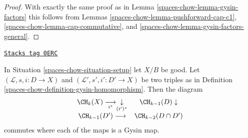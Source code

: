 \begin{proof}
With exactly the same proof as in Lemma \ref{spaces-chow-lemma-gysin-factors}
this follows from Lemmas
\ref{spaces-chow-lemma-pushforward-cap-c1},
\ref{spaces-chow-lemma-cap-commutative}, and
\ref{spaces-chow-lemma-gysin-factors-general}.
\end{proof}

\begin{lemma}
\label{spaces-chow-lemma-gysin-commutes-gysin}
\href{https://stacks.math.columbia.edu/tag/0ERC}{\texttt{Stacks tag 0ERC}}

In Situation \ref{spaces-chow-situation-setup} let $X/B$ be good.
Let $(\mathcal{L}, s, i : D \to X)$ and
$(\mathcal{L}', s', i' : D' \to X)$ be two triples as in
Definition \ref{spaces-chow-definition-gysin-homomorphism}. Then the diagram
$$
\begin{array}{cc}\CH_k(X) \underset{i^*}{\longrightarrow}\underset{(i')^*}{\downarrow} & \CH_{k - 1}(D) \downarrow \\ \CH_{k - 1}(D') \longrightarrow & \CH_{k - 2}(D \cap D')\end{array}
$$
commutes where each of the maps is a Gysin map.
\end{lemma}

